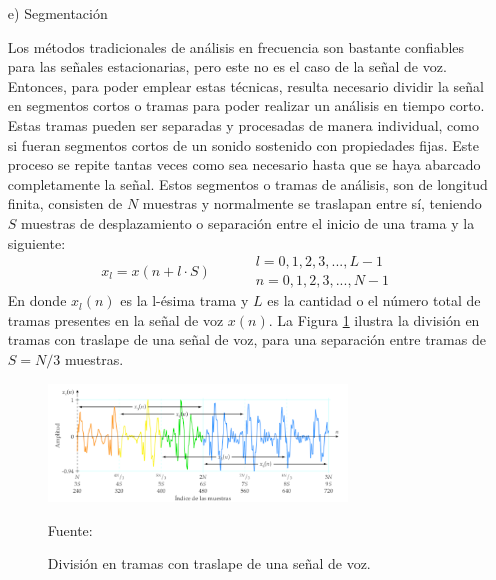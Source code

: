 \begin{enumerate}
\item[e)]Segmentación
\par
Los métodos tradicionales de análisis en frecuencia son bastante confiables para las señales estacionarias, pero este no es el caso de la señal de voz. Entonces, para poder emplear estas técnicas, resulta necesario dividir la señal en segmentos cortos o tramas para poder realizar un análisis en tiempo corto. Estas tramas pueden ser separadas y procesadas de manera individual, como si fueran segmentos cortos de un sonido sostenido con propiedades fijas. Este proceso se repite tantas veces como sea necesario hasta que se haya abarcado completamente la señal.
\vskip 0.5cm
Estos segmentos o tramas de análisis, son de longitud finita, consisten de $N$ muestras y normalmente se traslapan entre sí, teniendo $S$ muestras de desplazamiento o separación entre el inicio de una trama y la siguiente:
\begin{equation}
\label{eq:ecuacion33}
x_{l} = x(n + l \cdot S)\qquad
\begin{aligned}
& l = 0,1,2,3,...,L-1 \\
& n = 0,1,2,3,...,N-1
\end{aligned}
\end{equation}
En donde $x_{l}(n)$ es la l-ésima trama y $L$ es la cantidad o el número total de tramas presentes en la señal de voz $x(n)$. La Figura \ref{fig:figura2.33} ilustra la división en tramas con traslape de una señal de voz, para una separación entre tramas de $S = N/3$ muestras.
\newpage
\begin{figure}[ht]
\begin{center}
\includegraphics[width=0.75\textwidth]{Imagenes/Cap2/image034}
\end{center}
\begin{center}
\vskip -0.5cm
\caption{\small{División en tramas con traslape de una señal de voz.}}
\label{fig:figura2.33}
{\small{Fuente: \cite{eyra}}}
\end{center}
\end{figure}


\end{enumerate}
